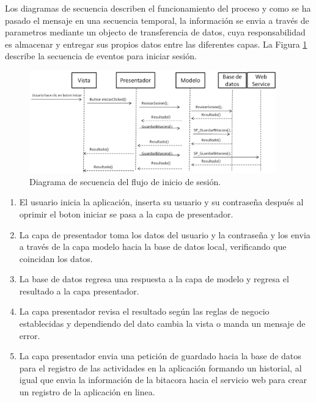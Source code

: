 Los diagramas de secuencia describen el funcionamiento del proceso y como se ha pasado el mensaje en una secuencia temporal, la información se envia a través de parametros mediante un objecto de transferencia de datos, cuya responsabilidad es almacenar y entregar sus propios datos entre las diferentes capas. La Figura \ref{ds1} describe la secuencia de eventos para iniciar sesión.

%
\begin{figure}[H]
\centering
\includegraphics[width=0.95\textwidth]{metodologia/DSIniciarSesion.jpg}
\caption{Diagrama de secuencia del flujo de inicio de sesión.}
\label{ds1}
\end{figure}
%

 \begin{enumerate}
\item El usuario inicia la aplicación, inserta su usuario y su contraseña después al oprimir el boton iniciar se pasa a la capa de presentador.
\item La capa de presentador toma los datos del usuario y la contraseña y los envia a través de la capa modelo hacia la base de datos local, verificando que coincidan los datos.
\item La base de datos regresa una respuesta a la capa de modelo y regresa el resultado a la capa presentador.
\item La capa presentador revisa el resultado según las reglas de negocio establecidas y dependiendo del dato cambia la vista o manda un mensaje de error.
\item La capa presentador envia una petición de guardado hacia la base de datos para el registro de las actividades en la aplicación formando un historial, al igual que envia la información de la bitacora hacia el servicio web para crear un registro de la aplicación en linea.
\end{enumerate}

